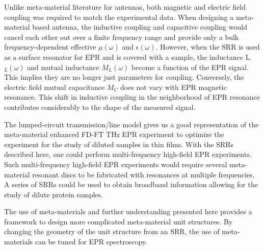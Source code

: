 Unlike meta-material literature for antennas, both magnetic and electric field coupling was required to match the experimental data. When designing a meta-material based antenna, the inductive coupling and capacitive coupling would cancel each other out over a finite frequency range and provide only a bulk frequency-dependent effective $\mu(\omega)$ and $\epsilon(\omega)$. However, when the SRR is used as a surface resonator for EPR and is covered with a sample, the inductance L$_L(\omega)$ and mutual inductance $M_L(\omega)$ become a function of the EPR signal. This implies they are no longer just parameters for coupling. Conversely, the electric field mutual capacitance $M_C$ does not vary with EPR magnetic resonance. This shift in inductive coupling in the neighborhood of EPR resonance contributes considerably to the shape of the measured signal.

The lumped-circuit transmission\-/line model gives us a good representation of the meta-material enhanced FD-FT THz EPR experiment to optimize the experiment for the study of diluted samples in thin films. With the SRRs described here, one could perform multi-frequency high-field EPR experiments. \cite{KRZYSTEK2006,Telser2014} Such multi-frequency high-field EPR experiments would require several meta-material resonant discs to be fabricated with resonances at multiple frequencies. A series of SRRs could be used to obtain broadband information allowing for the study of dilute protein samples.

The use of meta-materials and further understanding presented here provides a framework to design more complicated meta-material unit structures. By changing the geometry of the unit structure from an SRR, the use of meta-materials can be tuned for EPR spectroscopy. \cite{ZhangMetasurfaces}


{\renewcommand{\bibsection}{\clearpage\section*{\bibname}\markboth{\bibname}{\bibname}}
\renewcommand{\bibname}{CHAPTER 4. REFERENCES}


}